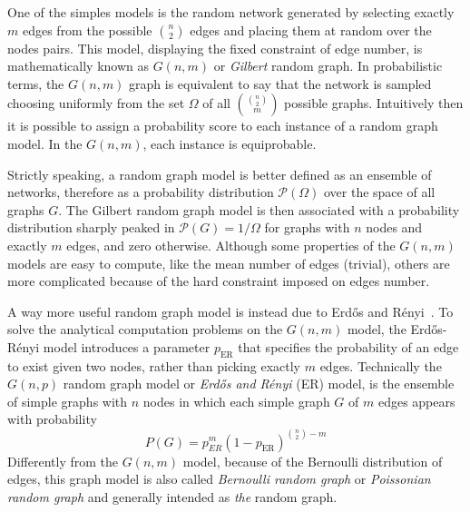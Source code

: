 One of the simples models is the random network generated by selecting exactly $m$ edges from the possible $\binom{n}{2}$ edges and placing them at random over the nodes pairs.
This model, displaying the fixed constraint of edge number, is mathematically known as $G(n,m)$ or \emph{Gilbert} random graph.
In probabilistic terms, the $G(n,m)$ graph is equivalent to say that the network is sampled choosing uniformly from the set $\Omega$ of all $\binom{\binom{n}{2}}{m}$ possible graphs. Intuitively then it is possible to assign a probability score to each instance of a random graph model. In the $G(n,m)$, each instance is equiprobable.

Strictly speaking, a random graph model is better defined as an ensemble of networks, therefore as a probability distribution $\mathcal{P}(\Omega)$ over the space of all graphs $G$.
The Gilbert random graph model is then associated with a probability distribution sharply peaked in $\mathcal{P}(G)=1/\Omega$ for graphs with $n$ nodes and exactly $m$ edges, and zero otherwise.
Although some properties of the $G(n,m)$ models are easy to compute, like the mean number of edges (trivial), others are more complicated because of the hard constraint imposed on edges number.

A way more useful random graph model is instead due to Erd\H{o}s and Rényi~\cite{erdos1959}. 
To solve the analytical computation problems on the $G(n,m)$ model, the Erd\H{o}s-Rényi model introduces a parameter $p_{\textrm{ER}}$ that specifies the probability of an edge to exist given two nodes, rather than picking exactly $m$ edges.
Technically the $G(n,p)$ random graph model or \emph{Erd\H{o}s and Rényi} (ER) model, is the ensemble of simple graphs with $n$ nodes in which each simple graph $G$ of $m$ edges appears with probability
\begin{equation}
P(G)={p}_{ER}^{m}(1-p_{\textrm{ER}})^{\binom{n}{2}-m}
\end{equation}
Differently from the $G(n,m)$ model, because of the Bernoulli distribution of edges, this graph model is also called \emph{Bernoulli random graph} or \emph{Poissonian random graph} and generally intended as \emph{the} random graph.

